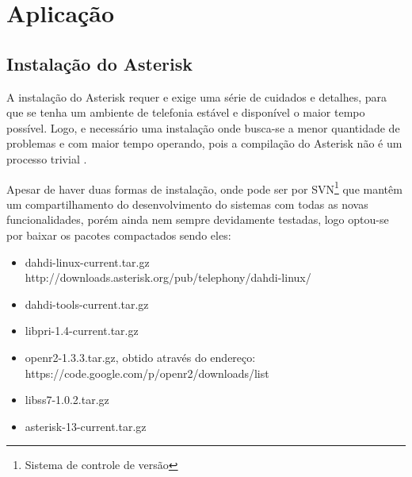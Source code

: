
\chapter{Aplicação} %
\section{Instalação do Asterisk}
A instalação do Asterisk requer e exige uma série de cuidados e detalhes,  para que se tenha um ambiente de telefonia estável e disponível o maior tempo possível. Logo, e necessário uma instalação onde busca-se a menor quantidade de problemas e com maior tempo operando, pois a compilação do Asterisk não é um processo trivial \cite{alexandrekeller2014}.

Apesar de haver duas formas de instalação, onde pode ser por SVN\footnote{Sistema de controle de versão} que mantêm um compartilhamento do desenvolvimento do sistemas com todas as novas funcionalidades, porém ainda nem sempre devidamente testadas, logo optou-se por baixar os pacotes compactados sendo eles:

\begin{itemize}
  \item dahdi-linux-current.tar.gz \newline http://downloads.asterisk.org/pub/telephony/dahdi-linux/
  \item dahdi-tools-current.tar.gz
  \item libpri-1.4-current.tar.gz
  \item openr2-1.3.3.tar.gz, obtido através do endereço: \newline https://code.google.com/p/openr2/downloads/list
  \item libss7-1.0.2.tar.gz
  \item asterisk-13-current.tar.gz
\end{itemize}
